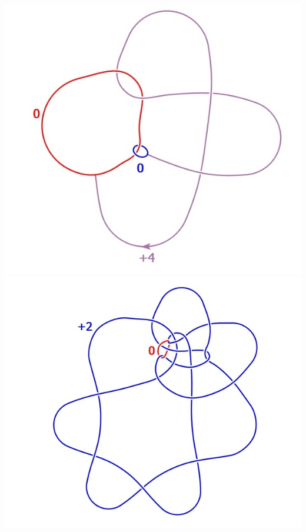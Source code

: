 \documentclass{beamer}
\theoremstyle{ex}
\theoremstyle{rem}
\begin{document}
\begin{frame}
\begin{itemize}
			\begin{center}
				\includegraphics[scale=0.4]{k_cup_c_example1}
				\includegraphics[scale=0.4]{k_cup_c_example2}
			\end{center}
		\end{itemize}
	\end{frame}

	
\end{document}
